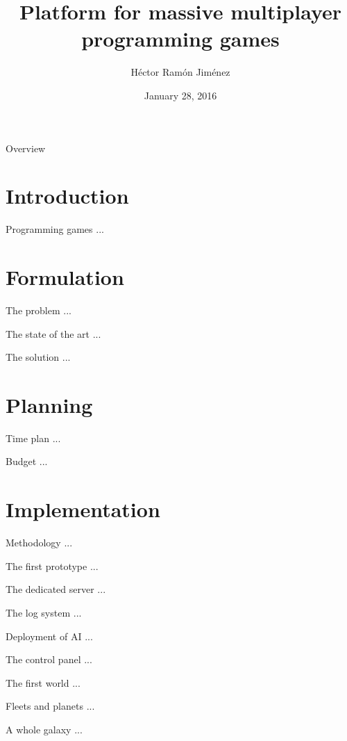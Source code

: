 \documentclass{beamer}
\title{Platform for massive multiplayer programming games}
\institute{Facultat d'Informàtica de Barcelona}
\author{Héctor Ramón Jiménez}
\date{January 28, 2016}
\begin{document}
\frame{\titlepage}
\begin{frame}{Overview}
\tableofcontents
\end{frame}
\section{Introduction}
\begin{frame}{Programming games}
...
\end{frame}
\section{Formulation}
\begin{frame}{The problem}
...
\end{frame}
\begin{frame}{The state of the art}
...
\end{frame}
\begin{frame}{The solution}
...
\end{frame}
\section{Planning}
\begin{frame}{Time plan}
...
\end{frame}
\begin{frame}{Budget}
...
\end{frame}
\section{Implementation}
\begin{frame}{Methodology}
...
\end{frame}
\begin{frame}{The first prototype}
...
\end{frame}
\begin{frame}{The dedicated server}
...
\end{frame}
\begin{frame}{The log system}
...
\end{frame}
\begin{frame}{Deployment of AI}
...
\end{frame}
\begin{frame}{The control panel}
...
\end{frame}
\begin{frame}{The first world}
...
\end{frame}
\begin{frame}{Fleets and planets}
...
\end{frame}
\begin{frame}{A whole galaxy}
...
\end{frame}
\end{document}
